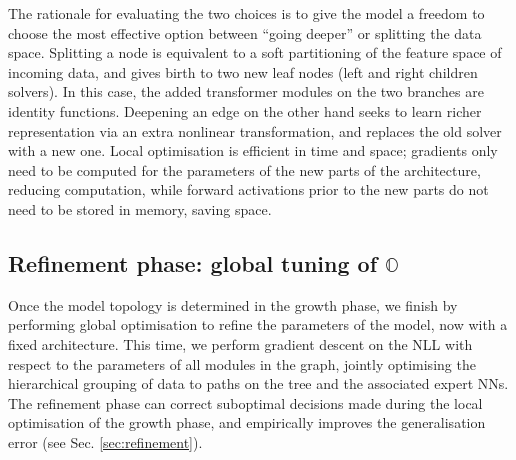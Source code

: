 The rationale for evaluating the two choices is to give the model a freedom to choose the most effective option between ``going deeper'' or splitting the data space. Splitting a node is equivalent to a soft partitioning of the feature space of incoming data, and gives birth to two new leaf nodes (left and right children solvers). In this case, the added transformer modules on the two branches are identity functions. Deepening an edge on the other hand seeks to learn richer representation via an extra nonlinear transformation, and replaces the old solver with a new one. Local optimisation is efficient in time and space; gradients only need to be computed for the parameters of the new parts of the architecture, reducing computation, while forward activations prior to the new parts do not need to be stored in memory, saving space. 


\subsection{Refinement phase: global tuning of \texorpdfstring{$\mathbb{O}$}{O}}
Once the model topology is determined in the growth phase, we finish by performing global optimisation to refine the parameters of the model, now with a fixed architecture. This time, we perform gradient descent on the NLL with respect to the parameters of all modules in the graph, jointly optimising the hierarchical grouping of data to paths on the tree and the associated expert NNs. The refinement phase can correct suboptimal decisions made during the local optimisation of the growth phase, and empirically improves the generalisation error (see Sec. \ref{sec:refinement}).